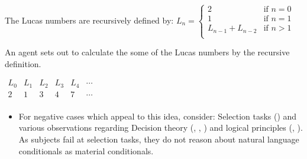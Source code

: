 \documentclass[10pt]{article}
\newcommand{\hand}{\ding{43}}
\begin{document}
\begin{note}
    \begin{scenario}%
    \label{scen:LucasNums}%
    The Lucas numbers are recursively defined by: \qquad
    \(
      L_{n} = \left\{
        \begin{array}{ll}
          2 & \text{if } n = 0 \\
          1 & \text{if } n = 1 \\
          L_{n-1} + L_{n-2} & \text{if } n > 1 \\
        \end{array}
      \right.
    \)

    \smallskip
    \noindent An agent sets out to calculate the some of the Lucas numbers by the recursive definition.
    \begin{center}
      \(
      \begin{array}{cccccc}
        L_{0} & L_{1} & L_{2} & L_{3} & L_{4} & \cdots \\
        \hline
        2 & 1 & 3 & 4 & 7 & \cdots \\
      \end{array}
      \)
    \end{center}
    \vspace{-2\baselineskip}
  \end{scenario}

\begin{comment}
  Note, the agent doesn't (necessarily) conclude \(L_{4}\) from \prop{0}-\val{0} pairs which detail \(L_{2}\) and \(L_{3}\).
  For, \(L_{2}\) and \(L_{3}\) both \fof{} the recursive definition.

  The agent's doesn't need anything other than the recursive definition to get \(L_{4}\), though they'll get \(L_{2}\) and \(L_{3}\) on the way to \(L_{4}\).
\end{comment}

  \begin{itemize}
  \item[\hand]
    For negative cases which appeal to this idea, consider:
    Selection tasks (\cite{Wason:1966aa}) and various observations regarding Decision theory (\cite{Allais:1979aa}, \cite{Ellsberg:1961aa}, \cite{Quinn:1990aa}) and logical principles (\cite{Makinson:1965aa}, \cite{Kyburg:1997aa}).\newline
    \mbox{}\hfill \leadsto As subjects fail at selection tasks, they do not reason about natural language conditionals as material conditionals.
  \end{itemize}
\end{note}
\end{document}
